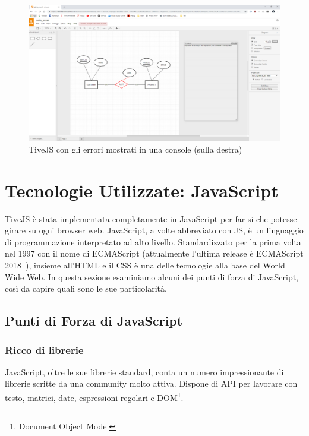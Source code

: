                 \begin{figure}[htbp]
                    \centering
                    \includegraphics[scale=0.20]{Figure/semanticTranslation_error.PNG}
                    \caption{TiveJS con gli errori mostrati in una console (sulla destra)}
                    \label{fig:semanticTranslation_error}
                \end{figure}

    \section{Tecnologie Utilizzate: JavaScript}
        TiveJS è stata implementata completamente in JavaScript per far si che potesse girare su ogni browser web.
        JavaScript, a volte abbreviato con JS, è un linguaggio di programmazione interpretato ad alto livello. Standardizzato per la prima volta nel 1997 con il nome di ECMAScript (attualmente l'ultima release è ECMAScript 2018~\cite{ecmascript}), insieme all'HTML e il CSS è una delle tecnologie alla base del World Wide Web.
        In questa sezione esaminiamo alcuni dei punti di forza di JavaScript, così da capire quali sono le sue particolarità.

        \subsection{Punti di Forza di JavaScript}

            \subsubsection{Ricco di librerie}
                JavaScript, oltre le sue librerie standard, conta un numero impressionante di librerie scritte da una community molto attiva. Dispone di API per lavorare con testo, matrici, date, espressioni regolari e DOM\footnote{Document Object Model}.


